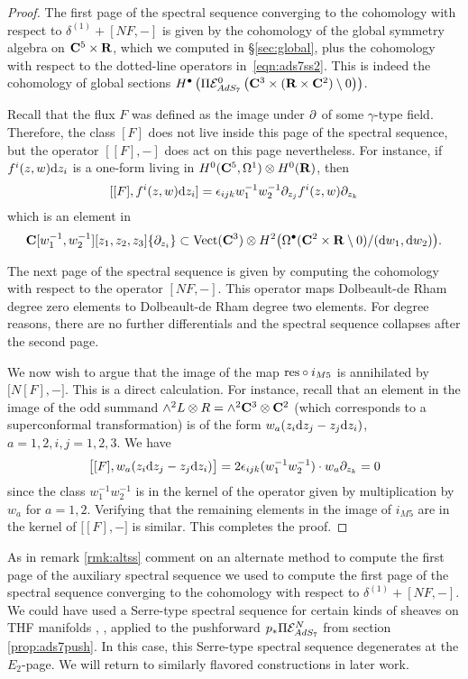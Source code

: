 \documentclass[../main.tex]{subfiles}
\begin{document}
\begin{proof}
The first page of the spectral sequence converging to the cohomology with respect to $\delta^{(1)} + [N F, -]$ is given by the cohomology of the global symmetry algebra on $\mathbf{C}^5 \times \mathbf{R}$, which we computed in \S \ref{sec:global}, plus the cohomology with respect to the dotted-line operators in~\eqref{eqn:ads7ss2}. This is indeed the cohomology of global sections $H^\bullet \left ( \Pi \mathcal{E}^0 _{AdS_7} \left ( \mathbf{C}^3\times (\mathbf{R}\times \mathbf{C}^2)\setminus 0\right )\right )$.

Recall that the flux $F$ was defined as the image under $\partial$ of some $\gamma$-type field. Therefore, the class $[F]$ does not live inside this page of the spectral sequence, but the operator $[[F], -]$ does act on this page nevertheless. For instance, if $f^i(z,w) \mathrm{d} z_i$ is a one-form living in $H^0(\mathbf{C}^5, \Omega^1) \otimes H^0(\mathbf{R})$, then
\[
[ [F] , f^i (z,w) \mathrm{d} z_i ] = \epsilon_{ijk} w_1^{-1} w_2^{-1} \partial_{z_j} f^i(z,w) \partial_{z_k} 
\]
which is an element in 
\[
\mathbf{C}[w_1^{-1}, w_2^{-1}][z_1,z_2,z_3] \{\partial_{z_i}\} \subset \text{Vect}(\mathbf{C}^3) \otimes H^2 \big(\Omega^\bullet(\mathbf{C}^2 \times \mathbf{R} \setminus 0) / (\mathrm{d} w_1 , \mathrm{d} w_2) \big) .
\]

The next page of the spectral sequence is given by computing the cohomology with respect to the operator $[N F,-]$. This operator maps Dolbeault-de Rham degree zero elements to Dolbeault-de Rham degree two elements. For degree reasons, there are no further differentials and the spectral sequence collapses after the second page. 

We now wish to argue that the image of the map $\mathrm{res}\circ i_{M5}$ is annihilated by $\big[ N [F] , - \big]$. This is a direct calculation. For instance, recall that an element in the image of the odd summand $\wedge^2 L \otimes R = \wedge^2 \mathbf{C}^3 \otimes \mathbf{C}^2$ (which corresponds to a superconformal transformation) is of the form $w_a (z_i \mathrm{d} z_j - z_j \mathrm{d} z_i)$, $a=1,2, i,j=1,2,3$. 
We have
\[
\big[[F] , w_a (z_i \mathrm{d} z_j - z_j \mathrm{d} z_i)\big] = 2 \epsilon_{ijk} (w_1^{-1} w_2^{-1}) \cdot w_a \partial_{z_k} = 0
\]
since the class $w_1^{-1} w_2^{-1}$ is in the kernel of the operator given by multiplication by $w_a$ for $a=1,2$.
Verifying that the remaining elements in the image of $i_{M5}$ are in the kernel of $\big[ [F], -\big]$ is similar.
This completes the proof.
\end{proof}

\begin{rmk}
As in remark \ref{rmk:altss} comment on an alternate method to compute the first page of the auxiliary spectral sequence we used to compute the first page of the spectral sequence converging to the cohomology with respect to $\delta^{(1)} + [NF, - ]$. We could have used a Serre-type spectral sequence for certain kinds of sheaves on THF manifolds \cite{KamberTondeur}, \cite{KormanThesis}, applied to the pushforward $ p_* \Pi \mathcal{E}^N_{AdS_7}$ from section \ref{prop:ads7push}. In this case, this Serre-type spectral sequence degenerates at the $E_2$-page. We will return to similarly flavored constructions in later work.
\end{rmk}
\end{document}

